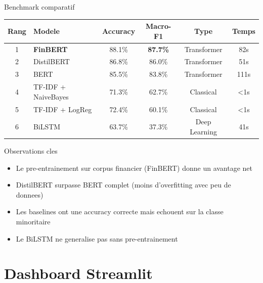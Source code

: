 \documentclass[aspectratio=169, 11pt]{beamer}
\begin{document}
\begin{frame}{Benchmark comparatif}
  \begin{table}
    \centering
    \begin{tabular}{clcccc}
      \toprule
      Rang & Modele & Accuracy & Macro-F1 & Type & Temps \\
      \midrule
      1 & \textbf{FinBERT}    & 88.1\% & \textbf{87.7\%} & Transformer & 82s \\
      2 & DistilBERT           & 86.8\% & 86.0\% & Transformer & 51s \\
      3 & BERT                 & 85.5\% & 83.8\% & Transformer & 111s \\
      4 & TF-IDF + NaiveBayes  & 71.3\% & 62.7\% & Classical   & <1s \\
      5 & TF-IDF + LogReg      & 72.4\% & 60.1\% & Classical   & <1s \\
      6 & BiLSTM               & 63.7\% & 37.3\% & Deep Learning & 41s \\
      \bottomrule
    \end{tabular}
  \end{table}
  \vspace{0.3cm}
  \begin{block}{Observations cles}
    \begin{itemize}
      \item Le pre-entrainement sur corpus financier (FinBERT) donne un avantage net
      \item DistilBERT surpasse BERT complet (moins d'overfitting avec peu de donnees)
      \item Les baselines ont une accuracy correcte mais echouent sur la classe minoritaire
      \item Le BiLSTM ne generalise pas sans pre-entrainement
    \end{itemize}
  \end{block}
\end{frame}

\section{Dashboard Streamlit}
\end{document}
